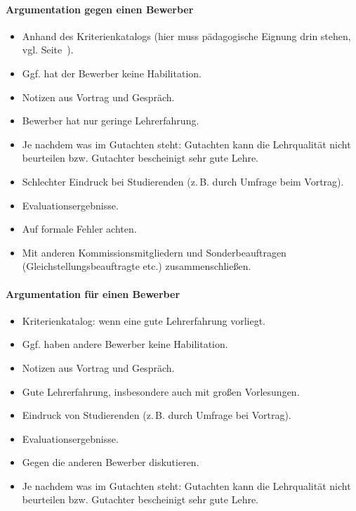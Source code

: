 \paragraph{Argumentation gegen einen Bewerber}
\begin{itemize}
    \item Anhand des Kriterienkatalogs (hier muss pädagogische Eignung drin stehen, vgl. Seite~\pageref{kriterienkatalog}).
    \item Ggf. hat der Bewerber keine Habilitation.
    \item Notizen aus Vortrag und Gespräch.
    \item Bewerber hat nur geringe Lehrerfahrung.
    \item Je nachdem was im Gutachten steht: Gutachten kann die Lehrqualität nicht beurteilen bzw. Gutachter bescheinigt sehr gute Lehre.
    \item Schlechter Eindruck bei Studierenden (z.\,B. durch Umfrage beim Vortrag).
    \item Evaluationsergebnisse.
    \item Auf formale Fehler achten.
    \item Mit anderen Kommissionsmitgliedern und Sonderbeauftragen (Gleichstellungsbeauftragte etc.) zusammenschließen.
\end{itemize}

\paragraph{Argumentation für einen Bewerber}
\begin{itemize}
    \item Kriterienkatalog: wenn eine gute Lehrerfahrung vorliegt.
    \item Ggf. haben andere Bewerber keine Habilitation.
    \item Notizen aus Vortrag und Gespräch.
    \item Gute Lehrerfahrung, insbesondere auch mit großen Vorlesungen.
    \item Eindruck von Studierenden (z.\,B. durch Umfrage bei Vortrag).
    \item Evaluationsergebnisse.
    \item Gegen die anderen Bewerber diskutieren.
    \item Je nachdem was im Gutachten steht: Gutachten kann die Lehrqualität nicht beurteilen bzw. Gutachter bescheinigt sehr gute Lehre.
\end{itemize}

